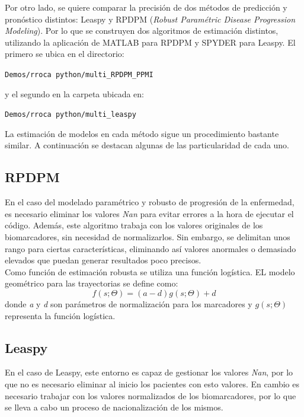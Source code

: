 Por otro lado, se quiere comparar la precisión de dos métodos de predicción y pronóstico distintos: Leaspy y RPDPM (\textit{Robust Paramétric Disease Progression Modeling}). Por lo que se construyen dos algoritmos de estimación distintos, utilizando la aplicación de MATLAB para RPDPM y SPYDER para Leaspy. El primero se ubica en el directorio:
\begin{center}
	\texttt{Demos/rroca python/multi\_RPDPM\_PPMI}
\end{center}
y el segundo en la carpeta ubicada en:
\begin{center}
	\texttt{Demos/rroca python/multi\_leaspy}
\end{center}

La estimación de modelos en cada método sigue un procedimiento bastante similar. A continuación se destacan algunas de las particularidad de cada uno.

\subsection{RPDPM}
En el caso del modelado paramétrico y robusto de progresión de la enfermedad, es necesario eliminar los valores \textit{Nan} para evitar errores a la hora de ejecutar el código. Además, este algoritmo trabaja con los valores originales de los biomarcadores, sin necesidad de normalizarlos. Sin embargo, se delimitan unos rango para ciertas características, eliminando así valores anormales o demasiado elevados que puedan generar resultados poco precisos.\\

Como función de estimación robusta se utiliza una función logística. EL modelo geométrico para las trayectorias se define como:
\begin{equation}
	f(s; \Theta) = (a - d)g(s; \Theta) + d
\end{equation}
 donde \textit{a} y \textit{d} son parámetros de normalización para los marcadores y $g(s; \Theta)$ representa la función logística. \cite{9225726}

\subsection{Leaspy}
En el caso de Leaspy, este entorno es capaz de gestionar los valores \textit{Nan}, por lo que no es necesario eliminar al inicio los pacientes con esto valores. En cambio es necesario trabajar con los valores normalizados de los biomarcadores, por lo que se lleva a cabo un proceso de nacionalización de los mismos. \\

